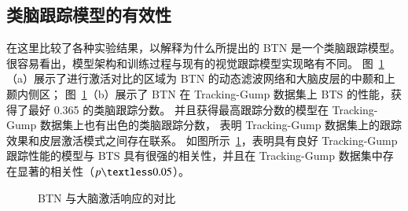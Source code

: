 

\subsection{类脑跟踪模型的有效性}
在这里比较了各种实验结果，以解释为什么所提出的 BTN 是一个类脑跟踪模型。
很容易看出，模型架构和训练过程与现有的视觉跟踪模型实现略有不同。
%
图~\ref{fig:neural_predictivity}（a）展示了进行激活对比的区域为 BTN 的动态滤波网络和大脑皮层的中颞和上颞内侧区；
图~\ref{fig:neural_predictivity}（b）展示了 BTN 在 Tracking-Gump 数据集上 BTS 的性能，获得了最好 0.365 的类脑跟踪分数。
并且获得最高跟踪分数的模型在 Tracking-Gump 数据集上也有出色的类脑跟踪分数，
表明 Tracking-Gump 数据集上的跟踪效果和皮层激活模式之间存在联系。
如图所示~\ref{fig:neural_predictivity}，表明具有良好 Tracking-Gump 跟踪性能的模型与 BTS 具有很强的相关性，并且在 Tracking-Gump 数据集中存在显著的相关性（$p \textless 0.05$）。


\begin{figure}[htbp]
	\centering
	

	
	\centering
	\caption{BTN 与大脑激活响应的对比}
	\label{fig:neural_predictivity}
\end{figure}


